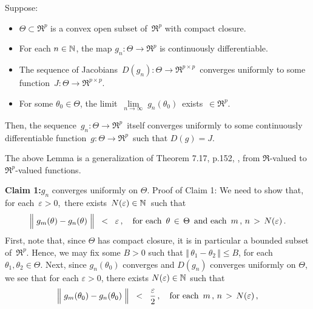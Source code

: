 \clearpage

\begin{lemma}
\mbox{}\vskip 0.1cm
\noindent
Suppose:
\begin{itemize}
\item
	$\Theta \subset \Re^{p}$ is a convex open subset of \,$\Re^{p}$ with compact closure.
\item
	For each $n\in\mathbb{N}$, the map $g_{n} : \Theta \longrightarrow \Re^{p}$ is continuously differentiable.
\item
	The sequence of Jacobians
	\,$D(g_{n}) : \Theta \longrightarrow \Re^{p \times p}$\,
	converges uniformly to some function
	\,$J : \Theta \longrightarrow \Re^{p \times p}$.
\item
	For some $\theta_{0} \in \Theta$, the limit
	\,$\underset{n\rightarrow\infty}{\lim}\;g_{n}(\theta_{0})$\,
	exists \,$\in \Re^{p}$.
\end{itemize}
Then, the sequence
\,$g_{n} : \Theta \longrightarrow \Re^{p}$\,
itself converges uniformly to some continuously differentiable function
\,$g : \Theta \longrightarrow \Re^{p}$\,
such that $D(g) = J$.
\end{lemma}
\begin{remark}\;\;
The above Lemma is a generalization of Theorem 7.17, p.152, \cite{Rudin1976}, from $\Re$-valued to $\Re^{p}$-valued functions.
\end{remark}
\proof
\vskip 0.3cm
\noindent
\textbf{Claim 1:}\quad $g_{n}$ converges uniformly on $\Theta$.
\vskip 0.1cm
\noindent
Proof of Claim 1:\quad
We need to show that, for each \,$\varepsilon > 0$,\, there exists \,$N(\varepsilon) \in \mathbb{N}$\, such that
\begin{equation*}
\left\Vert\;g_{m}(\theta) \overset{{\color{white}.}}{-} g_{n}(\theta)\;\right\Vert \;\; < \;\; \varepsilon\,,
\quad
\textnormal{for each \,$\theta \,\in\, \Theta$\, and each \,$m\,,\,n \,>\, N(\varepsilon)$}\,.
\end{equation*}
First, note that, since $\Theta$ has compact closure, it is in particular a bounded subset of \,$\Re^{p}$.
Hence, we may fix some $B > 0$ such that
$\Vert\,\theta_{1} - \theta_{2}\,\Vert \leq B$, for each $\theta_{1}, \theta_{2}\in\Theta$.
Next, since $g_{n}(\theta_{0})$ converges and $D(g_{n})$ converges uniformly on $\Theta$,
we see that for each $\varepsilon > 0$, there exists $N(\varepsilon) \in \mathbb{N}$ such that
\begin{equation*}
\left\Vert\;g_{m}(\theta_{0}) \overset{{\color{white}.}}{-} g_{n}(\theta_{0})\;\right\Vert \;\; < \;\; \dfrac{\varepsilon}{2}\,,
\quad
\textnormal{for each \,$m\,,\,n \,>\, N(\varepsilon)$}\,,
\end{equation*}
